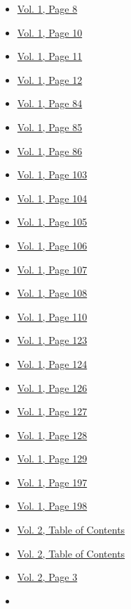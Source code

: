 \begin{itemize}
  \begin{itemize}
  \tightlist
  \item
    \protect\hyperlink{g-page-16}{Vol. 1, Page 8}
  \item
    \protect\hyperlink{g-page-18}{Vol. 1, Page 10}
  \item
    \protect\hyperlink{g-page-19}{Vol. 1, Page 11}
  \item
    \protect\hyperlink{g-page-20}{Vol. 1, Page 12}
  \item
    \protect\hyperlink{g-page-92}{Vol. 1, Page 84}
  \item
    \protect\hyperlink{g-page-93}{Vol. 1, Page 85}
  \item
    \protect\hyperlink{g-page-94}{Vol. 1, Page 86}
  \item
    \protect\hyperlink{g-page-111}{Vol. 1, Page 103}
  \item
    \protect\hyperlink{g-page-112}{Vol. 1, Page 104}
  \item
    \protect\hyperlink{g-page-113}{Vol. 1, Page 105}
  \item
    \protect\hyperlink{g-page-114}{Vol. 1, Page 106}
  \item
    \protect\hyperlink{g-page-115}{Vol. 1, Page 107}
  \item
    \protect\hyperlink{g-page-116}{Vol. 1, Page 108}
  \item
    \protect\hyperlink{g-page-118}{Vol. 1, Page 110}
  \item
    \protect\hyperlink{g-page-131}{Vol. 1, Page 123}
  \item
    \protect\hyperlink{g-page-132}{Vol. 1, Page 124}
  \item
    \protect\hyperlink{g-page-134}{Vol. 1, Page 126}
  \item
    \protect\hyperlink{g-page-135}{Vol. 1, Page 127}
  \item
    \protect\hyperlink{g-page-136}{Vol. 1, Page 128}
  \item
    \protect\hyperlink{g-page-137}{Vol. 1, Page 129}
  \item
    \protect\hyperlink{g-page-205}{Vol. 1, Page 197}
  \item
    \protect\hyperlink{g-page-206}{Vol. 1, Page 198}
  \item
    \protect\hyperlink{g-page-209}{Vol. 2, Table of Contents}
  \item
    \protect\hyperlink{g-page-210}{Vol. 2, Table of Contents}
  \item
    \protect\hyperlink{g-page-215}{Vol. 2, Page 3}
  \item

\end{itemize}
\end{itemize}
